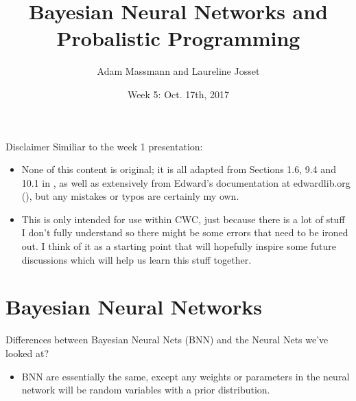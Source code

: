\documentclass{beamer}
\title[Your Short Title]{Bayesian Neural  Networks and Probalistic Programming}
\author{Adam Massmann and Laureline Josset}
\institute{Water Center NN Meetings}
\date{Week 5: Oct. 17th, 2017}
\begin{document}
\begin{frame}
  \titlepage
\end{frame}


\begin{frame}{Disclaimer}
  Similiar to the week 1 presentation:
  \begin{itemize}
  \item None of this content is original; it is all adapted from Sections 1.6, 9.4 and 10.1 in \cite{bishop}, as well as extensively from Edward's documentation at edwardlib.org (\cite{tran2016}), but any mistakes or typos are certainly my own.
  \item This is only intended for use within CWC, just because there is a lot of stuff I don't fully understand so there might be some errors that need to be ironed out. I think of it as a starting point that will hopefully inspire some future discussions which will help us learn this stuff together.
  \end{itemize}
\end{frame}

\section{Bayesian Neural Networks}
\begin{frame}{Differences between Bayesian Neural Nets (BNN) and the Neural Nets  we've looked at?}
  \begin{itemize}
  \item BNN are essentially the same, except any weights or parameters in the neural network will be random variables with a prior distribution.
  \end{itemize}
\end{frame}
\end{document}
